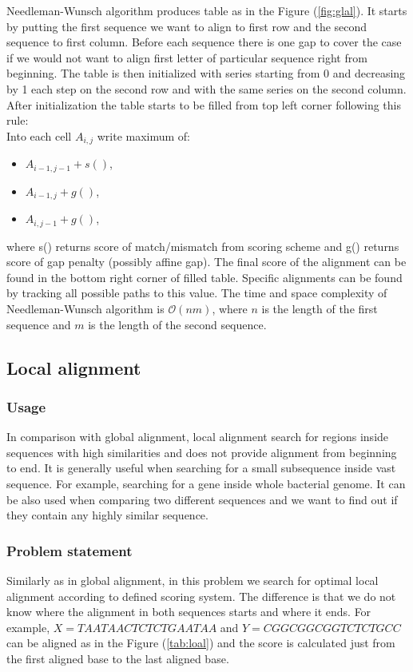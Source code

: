 Needleman-Wunsch algorithm produces table as in the Figure (\ref{fig:glal}). 
It starts by putting the first sequence we want to align to first row and the second sequence to first column.
Before each sequence there is one gap to cover the case if we would not want to align first letter of particular sequence right from beginning.
The table is then initialized with series starting from 0 and decreasing by 1 each step on the second row and with the same series on the second column.
After initialization the table starts to be filled from top left corner following this rule:\\
Into each cell $A_{i,j}$ write maximum of:
\begin{itemize}
\item $A_{i-1, j-1} + s()$,
\item $A_{i-1, j} + g()$,
\item $A_{i, j-1} + g()$,
\end{itemize}
where s() returns score of match/mismatch from scoring scheme and g() returns score of gap penalty (possibly affine gap).
The final score of the alignment can be found in the bottom right corner of filled table.
Specific alignments can be found by tracking all possible paths to this value.
The time and space complexity of Needleman-Wunsch algorithm is $\mathcal{O}(nm)$, where $n$ is the length of the first sequence and $m$ is the length of the second sequence.

\subsection{Local alignment}
\subsubsection{Usage}
In comparison with global alignment, local alignment search for regions inside sequences with high similarities and does not provide alignment from beginning to end.
It is generally useful when searching for a small subsequence inside vast sequence.
For example, searching for a gene inside whole bacterial genome.
It can be also used when comparing two different sequences and we want to find out if they contain any highly similar sequence.

\subsubsection{Problem statement}
Similarly as in global alignment, in this problem we search for optimal local alignment according to defined scoring system.
The difference is that we do not know where the alignment in both sequences starts and where it ends.
For example, $ X = TAATAACTCTCTGAATAA $ and $ Y = CGGCGGCGGTCTCTGCC $ can be aligned as in the Figure (\ref{tab:loal}) and the score is calculated just from the first aligned base to the last aligned base.

